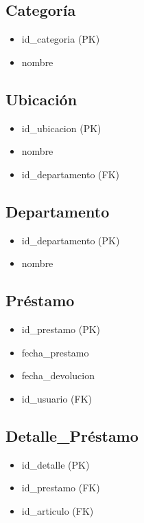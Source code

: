 \documentclass{article}
\begin{document}
\subsection{Categoría}
\begin{itemize}
    \item id\_categoria (PK)
    \item nombre
\end{itemize}

\subsection{Ubicación}
\begin{itemize}
    \item id\_ubicacion (PK)
    \item nombre
    \item id\_departamento (FK)
\end{itemize}

\subsection{Departamento}
\begin{itemize}
    \item id\_departamento (PK)
    \item nombre
\end{itemize}

\subsection{Préstamo}
\begin{itemize}
    \item id\_prestamo (PK)
    \item fecha\_prestamo
    \item fecha\_devolucion
    \item id\_usuario (FK)
\end{itemize}

\subsection{Detalle\_Préstamo}
\begin{itemize}
    \item id\_detalle (PK)
    \item id\_prestamo (FK)
    \item id\_articulo (FK)
\end{itemize}
\end{document}

